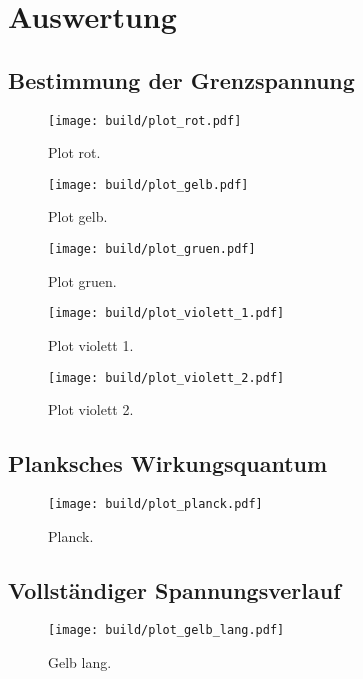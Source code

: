 \section{Auswertung}
\label{sec:Auswertung}

\subsection{Bestimmung der Grenzspannung}

\begin{figure} [H]
  \centering
  \texttt{[image: build/plot\_rot.pdf]}
  \caption{Plot rot.}
  \label{fig:plot_rot}
\end{figure}

\begin{figure} [H]
  \centering
  \texttt{[image: build/plot\_gelb.pdf]}
  \caption{Plot gelb.}
  \label{fig:plot_gelb}
\end{figure}

\begin{figure} [H]
  \centering
  \texttt{[image: build/plot\_gruen.pdf]}
  \caption{Plot gruen.}
  \label{fig:plot_gruen}
\end{figure}

\begin{figure} [H]
  \centering
  \texttt{[image: build/plot\_violett\_1.pdf]}
  \caption{Plot violett 1.}
  \label{fig:plot_violett_1}
\end{figure}

\begin{figure} [H]
  \centering
  \texttt{[image: build/plot\_violett\_2.pdf]}
  \caption{Plot violett 2.}
  \label{fig:plot_violett_2}
\end{figure}

\subsection{Planksches Wirkungsquantum}

\begin{figure} [H]
  \centering
  \texttt{[image: build/plot\_planck.pdf]}
  \caption{Planck.}
  \label{fig:planck}
\end{figure}

\subsection{Vollständiger Spannungsverlauf}

\begin{figure} [H]
  \centering
  \texttt{[image: build/plot\_gelb\_lang.pdf]}
  \caption{Gelb lang.}
  \label{fig:gelb_lang}
\end{figure}